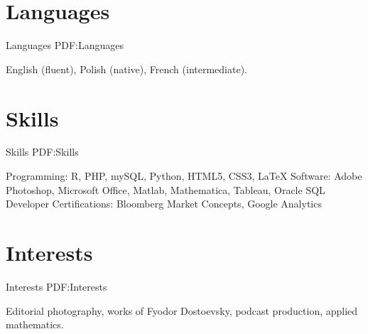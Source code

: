 \documentclass[letterpaper,10pt,oneside]{article}
\newcommand{\CVNote}{Resume compiled on {\today}}
\begin{document}
\begin{body}
\begin{comment}
\GapNoBreak
\BulletItem
Photography Editor
\begin{detail}
\SubBulletItem
Collaborated with Trinity College Student Photographers to provide photographic content for weekly paper.
\SubBulletItem
Delivered hundreds of images for a variety of different stories, including custom stock imagery.
\SubBulletItem
Developed automated system for photo captioning using EXIF data, extracted using Adobe InDesign, resulting in 75\% time decrease when formatting images.
\end{detail}
\end{comment}


\noindent\hrulefill
\section
{Languages}
{Languages}
{PDF:Languages}

English (fluent), Polish (native), French (intermediate).


\section
{Skills}
{Skills}
{PDF:Skills}

Programming: R, PHP, mySQL, Python, HTML5, CSS3, \LaTeX \hfill\break
Software: Adobe Photoshop, Microsoft Office, Matlab, Mathematica, Tableau, Oracle SQL Developer\hfill\break
Certifications: Bloomberg Market Concepts, Google Analytics


\section
{Interests}
{Interests}
{PDF:Interests}

Editorial photography, works of Fyodor Dostoevsky, podcast production, applied mathematics.


\begin{comment}
\section
{References}
{References}
{PDF:References}

Available upon request.
\end{comment}
\end{body}


\begin{flushright}
\UseNoteFont
\hspace{2.0mm}\null
\end{flushright}
\end{document}
